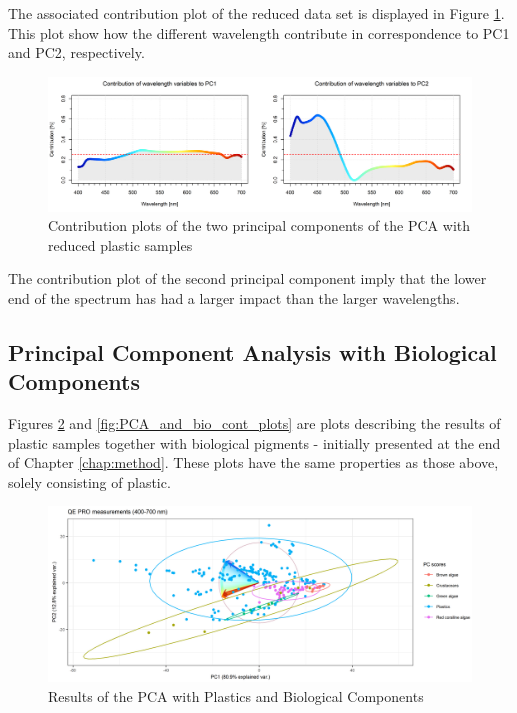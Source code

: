 \\\\
\noindent
The associated contribution plot of the reduced data set is displayed in Figure \ref{fig:PCA_plastics_doub_cont}. This plot show how the different wavelength contribute in correspondence to PC1 and PC2, respectively.

\begin{figure}[H]
    \centering
    \includegraphics[width=1\textwidth]{Images/results/PCA_plastics_reduced_doub_cont.png}
    \caption[Contribution Plot Reduced Set]{Contribution plots of the two principal components of the PCA with reduced plastic samples}
    \label{fig:PCA_plastics_doub_cont}
\end{figure}
\noindent
The contribution plot of the second principal component imply that the lower end of the spectrum has had a larger impact than the larger wavelengths.

\subsection{Principal Component Analysis with Biological Components}
Figures \ref{fig:PCA_plastics_and_biology_scat} and \ref{fig:PCA_and_bio_cont_plots} are plots describing the results of plastic samples together with biological pigments - initially presented at the end of Chapter \ref{chap:method}. These plots have the same properties as those above, solely consisting of plastic.

\begin{figure}[H]
    \centering
    \includegraphics[width=1\textwidth]{Images/results/PCA_plastics_and_biology_scat_clust.png}
    \caption[PCA Plastics and Biological Pigments]{Results of the PCA with Plastics and Biological Components}
    \label{fig:PCA_plastics_and_biology_scat}
\end{figure}


